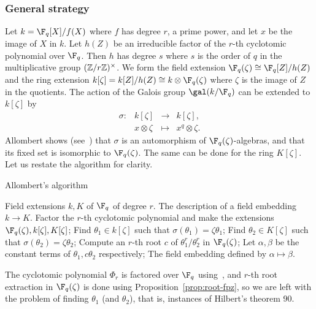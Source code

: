 \subsubsection{General strategy}
Let $k=\F_q[X]/f(X)$ where $f$ has degree $r$, a prime power, and let $x$ be the image of $X$ in $k$.
Let $h(Z)$ be an 
irreducible factor of the $r$-th cyclotomic polynomial over $\F_q$. Then $h$ has degree $s$ where 
$s$ is the order of $q$ in the multiplicative group $(\mathbb{Z}/r\mathbb{Z})^\times$. We form the field extension
$\F_q(\zeta) \cong \F_q[Z] / h(Z)$ and the ring extension $k[\zeta] = k[Z] / h(Z) \cong k \otimes
\F_q(\zeta)$ where $\zeta$ is the image of $Z$ in the quotients. The action of the Galois group
$\gal(k / \F_q)$ can be extended to $k[\zeta]$ by
\[
\left.
\begin{array}{llll}
\sigma: & k[\zeta] & \rightarrow & k[\zeta], \\
& x \otimes \zeta & \mapsto & x^q \otimes \zeta.
\end{array}
\right.
\]
Allombert shows (see~\cite[Prop.~3.2]{Allombert02}) that $\sigma$ is
an automorphism of $\F_q(\zeta)$-algebras, and that its fixed set is
isomorphic to $\F_q(\zeta)$.
The same can be done for the ring $K[\zeta]$.
Let us restate the algorithm for clarity.

\begin{algorithm}
  \caption{Allombert's algorithm}
	\begin{algorithmic}[1]
		\REQUIRE Field extensions $k, K$ of $\F_q$ of degree $r$.
		\ENSURE The description of a field embedding $k\to K$.
		\STATE Factor the $r$-th cyclotomic polynomial and make the extensions $\F_q(\zeta), 
		k[\zeta], K[\zeta]$;
		\STATE Find $\theta_1 \in k[\zeta]$ such that $\sigma(\theta_1) = \zeta\theta_1$;
		\STATE Find $\theta_2 \in K[\zeta]$ such that $\sigma(\theta_2) = \zeta\theta_2$;
		\STATE Compute an $r$-th root $c$ of $\theta_1^r / \theta_2^r$ in $\F_q(\zeta)$;
		\STATE Let $\alpha, \beta$ be the constant terms of $\theta_1, c\theta_2$ respectively;
		\RETURN The field embedding defined by $\alpha\mapsto\beta$.
	\end{algorithmic}
        \label{alog:allombert}
\end{algorithm}


The cyclotomic polynomial $\Phi_r$ is factored over $\F_q$
using~\cite[Theorem~9]{shoup94}, and $r$-th root extraction in
$\F_q(\zeta)$ is done using Proposition~\ref{prop:root-fpz}, so we are
left with the problem of finding $\theta_1$ (and $\theta_2$), that is,
instances of Hilbert's theorem 90.  

